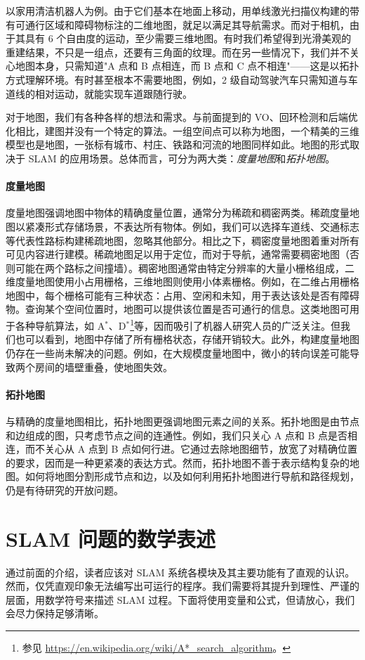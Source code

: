以家用清洁机器人为例。由于它们基本在地面上移动，用单线激光扫描仪构建的带有可通行区域和障碍物标注的二维地图，就足以满足其导航需求。而对于相机，由于其具有 6 个自由度的运动，至少需要三维地图。有时我们希望得到光滑美观的重建结果，不只是一组点，还要有三角面的纹理。而在另一些情况下，我们并不关心地图本身，只需知道"A 点和 B 点相连，而 B 点和 C 点不相连"——这是以拓扑方式理解环境。有时甚至根本不需要地图，例如，2 级自动驾驶汽车只需知道与车道线的相对运动，就能实现车道跟随行驶。

对于地图，我们有各种各样的想法和需求。与前面提到的 VO、回环检测和后端优化相比，建图并没有一个特定的算法。一组空间点可以称为地图，一个精美的三维模型也是地图，一张标有城市、村庄、铁路和河流的地图同样如此。地图的形式取决于 SLAM 的应用场景。总体而言，可分为两大类：\emph{度量地图}和\emph{拓扑地图}。

\paragraph{度量地图}
度量地图强调地图中物体的精确度量位置，通常分为稀疏和稠密两类。稀疏度量地图以紧凑形式存储场景，不表达所有物体。例如，我们可以选择车道线、交通标志等代表性路标构建稀疏地图，忽略其他部分。相比之下，稠密度量地图着重对所有可见内容进行建模。稀疏地图足以用于定位，而对于导航，通常需要稠密地图（否则可能在两个路标之间撞墙）。稠密地图通常由特定分辨率的大量小栅格组成，二维度量地图使用小占用栅格，三维地图则使用小体素栅格。例如，在二维占用栅格地图中，每个栅格可能有三种状态：占用、空闲和未知，用于表达该处是否有障碍物。查询某个空间位置时，地图可以提供该位置是否可通行的信息。这类地图可用于各种导航算法，如 A$^*$、D$^*$\footnote{ 参见 \url{https://en.wikipedia.org/wiki/A*_search_algorithm}。}等，因而吸引了机器人研究人员的广泛关注。但我们也可以看到，地图中存储了所有栅格状态，存储开销较大。此外，构建度量地图仍存在一些尚未解决的问题。例如，在大规模度量地图中，微小的转向误差可能导致两个房间的墙壁重叠，使地图失效。

\paragraph{拓扑地图}
与精确的度量地图相比，拓扑地图更强调地图元素之间的关系。拓扑地图是由节点和边组成的图，只考虑节点之间的连通性。例如，我们只关心 A 点和 B 点是否相连，而不关心从 A 点到 B 点如何行进。它通过去除地图细节，放宽了对精确位置的要求，因而是一种更紧凑的表达方式。然而，拓扑地图不善于表示结构复杂的地图。如何将地图分割形成节点和边，以及如何利用拓扑地图进行导航和路径规划，仍是有待研究的开放问题。

\section{SLAM 问题的数学表述}
通过前面的介绍，读者应该对 SLAM 系统各模块及其主要功能有了直观的认识。然而，仅凭直观印象无法编写出可运行的程序。我们需要将其提升到理性、严谨的层面，用数学符号来描述 SLAM 过程。下面将使用变量和公式，但请放心，我们会尽力保持足够清晰。

